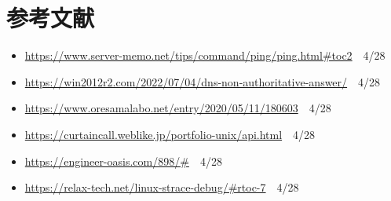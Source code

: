 \documentclass[dvipdfmx]{jarticle}
\begin{document}
\section{参考文献}
\begin{itemize}
    \item \url{https://www.server-memo.net/tips/command/ping/ping.html#toc2}　4/28
    \item \url{https://win2012r2.com/2022/07/04/dns-non-authoritative-answer/}　4/28
    \item \url{https://www.oresamalabo.net/entry/2020/05/11/180603}　4/28
    \item \url{https://curtaincall.weblike.jp/portfolio-unix/api.html}　4/28
    \item \url{https://engineer-oasis.com/898/#}　4/28
    \item \url{https://relax-tech.net/linux-strace-debug/#rtoc-7}　4/28
\end{itemize}
\end{document}
